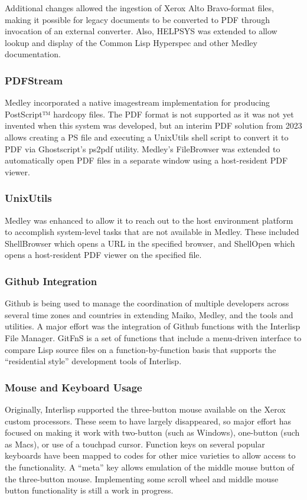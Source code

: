 \documentclass[sigconf]{acmart}
\begin{document}
Additional changes allowed the ingestion of Xerox Alto Bravo-format files, making it possible for legacy documents to be converted to PDF through invocation of an external converter. Also, HELPSYS was extended to allow lookup and display of the Common Lisp Hyperspec and other Medley documentation.

\subsubsection{PDFStream}
Medley incorporated a native imagestream implementation for producing PostScript™ hardcopy files. The PDF format is not supported as it was not yet invented when this system was developed, but an interim PDF solution from 2023 allows creating a PS file and executing a UnixUtils shell script to convert it to PDF via Ghostscript's ps2pdf utility. Medley's FileBrowser was extended to automatically open PDF files in a separate window using a host-resident PDF viewer.

\subsubsection{UnixUtils}

Medley was enhanced to allow it to reach out to the host environment platform to accomplish system-level tasks that are not available in Medley. These included ShellBrowser which opens a URL in the specified browser, and ShellOpen which opens a host-resident PDF viewer on the specified file.

\subsubsection{Github Integration}

Github is being used to manage the coordination of multiple developers across several time zones and countries in extending Maiko, Medley, and the tools and utilities. A major effort was the integration of Github functions with the Interlisp File Manager. GitFnS is a set of functions that include a menu-driven interface to compare Lisp source files on a function-by-function basis that supports the ``residential style'' development tools of Interlisp.

\subsubsection{Mouse and Keyboard Usage}

Originally, Interlisp supported the three-button mouse available on the Xerox custom processors. These seem to have largely disappeared, so major effort has focused on making it work with two-button (such as Windows), one-button (such as Macs), or use of a touchpad cursor. Function keys on several popular keyboards have been mapped to codes for other mice varieties to allow access to the functionality. A ``meta'' key allows emulation of the middle mouse button of the three-button mouse. Implementing some scroll wheel and middle mouse button functionality is still a work in progress.
\end{document}
